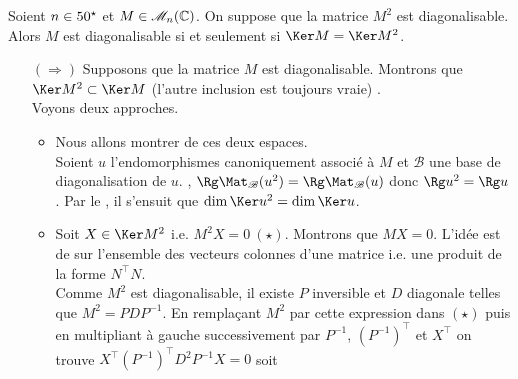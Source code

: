 \begin{prop}
    Soient $n \in 50^\star$ et $M \in \mathscr{M}_n(\mathbb{C})$. On suppose que la matrice $M^2$ est diagonalisable. Alors $M$ est diagonalisable si et seulement si $\Ker M = \Ker M^2$.
\end{prop}

\begin{demo}
    \begin{itemize}
        \item[$(\Rightarrow)$] 
        Supposons que la matrice $M$ est diagonalisable. Montrons que $\Ker M^2 \subset \Ker M$ (l'autre inclusion est toujours vraie) \note . \\
        Voyons deux approches.
        \begin{itemize}
            \item Nous allons montrer  de ces deux espaces. \\
            Soient $u$ l'endomorphismes canoniquement associé à $M$ et $\mathscr{B}$ une base de diagonalisation de $u$. , $\Rg \Mat_\mathscr{B}(u^2) = \Rg  \Mat_\mathscr{B}(u)$ donc $\Rg u^2 = \Rg u$ \note.
            Par le , il s'ensuit que $\dim \Ker u^2 = \dim \Ker u$.
            \item Soit $X \in \Ker M^2$ i.e. $M^2 X = 0\ (\star)$. Montrons que $MX = 0$. L'idée est de  sur l'ensemble des vecteurs colonnes d'une matrice i.e. une produit de la forme $N^\top N$. \\
            Comme $M^2$ est diagonalisable, il existe $P$ inversible et $D$ diagonale telles que $M^2 = PDP^{-1}$. En remplaçant $M^2$ par cette expression dans $(\star)$ puis en multipliant à gauche successivement par $P^{-1}$,  $(P^{-1})^\top$ et $X^\top$ on trouve $X^\top (P^{-1})^\top D^2 P^{-1} X = 0$ soit 

\end{itemize}
\end{itemize}
\end{demo}
